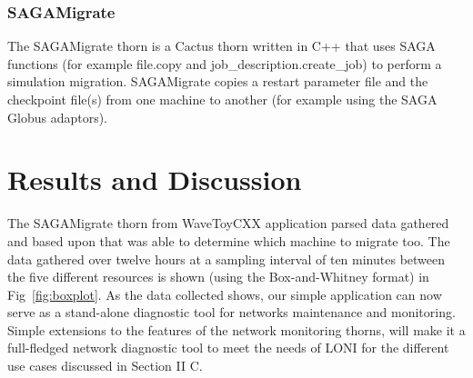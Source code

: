 \documentclass[conference,final]{IEEEtran}
\begin{document}
{\subsubsection{SAGAMigrate} The SAGAMigrate thorn is a Cactus thorn
written in C++ that uses SAGA functions (for example file.copy and
job\_description.create\_job) to perform a simulation migration.
SAGAMigrate copies a restart parameter file and the checkpoint file(s)
from one machine to another (for example using the SAGA Globus
adaptors).



\section{Results and Discussion}


The SAGAMigrate thorn from WaveToyCXX application parsed data gathered
and based upon that was able to determine which machine to migrate
too. The data gathered over twelve hours at a sampling interval of ten
minutes between the five different resources is shown (using the
Box-and-Whitney format) in Fig~\ref{fig:boxplot}.  As the data
collected shows, our simple application can now serve as a stand-alone
diagnostic tool for networks maintenance and monitoring.  Simple
extensions to the features of the network monitoring thorns, will make
it a full-fledged network diagnostic tool to meet the needs of LONI
for the different use cases discussed in Section II C.

}
\end{document}
